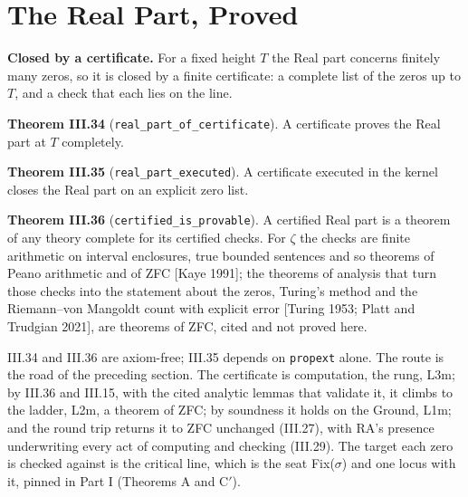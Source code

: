 \documentclass[10pt]{article}
\begin{document}
\hypertarget{the-real-part-proved}{%
\section{The Real Part, Proved}\label{the-real-part-proved}}

\textbf{Closed by a certificate.} For a fixed height \(T\) the Real part
concerns finitely many zeros, so it is closed by a finite certificate: a
complete list of the zeros up to \(T\), and a check that each lies on
the line.

\textbf{Theorem III.34} (\texttt{real\_part\_of\_certificate}). A
certificate proves the Real part at \(T\) completely.

\textbf{Theorem III.35} (\texttt{real\_part\_executed}). A certificate
executed in the kernel closes the Real part on an explicit zero list.

\textbf{Theorem III.36} (\texttt{certified\_is\_provable}). A certified
Real part is a theorem of any theory complete for its certified checks.
For \(\zeta\) the checks are finite arithmetic on interval enclosures,
true bounded sentences and so theorems of Peano arithmetic and of ZFC
{[}Kaye 1991{]}; the theorems of analysis that turn those checks into
the statement about the zeros, Turing's method and the Riemann--von
Mangoldt count with explicit error {[}Turing 1953; Platt and Trudgian
2021{]}, are theorems of ZFC, cited and not proved here.

III.34 and III.36 are axiom-free; III.35 depends on \texttt{propext}
alone. The route is the road of the preceding section. The certificate
is computation, the rung, L3m; by III.36 and III.15, with the cited
analytic lemmas that validate it, it climbs to the ladder, L2m, a
theorem of ZFC; by soundness it holds on the Ground, L1m; and the round
trip returns it to ZFC unchanged (III.27), with RA's presence
underwriting every act of computing and checking (III.29). The target
each zero is checked against is the critical line, which is the seat
Fix(\(\sigma\)) and one locus with it, pinned in Part I (Theorems A and
C\('\)).
\end{document}
